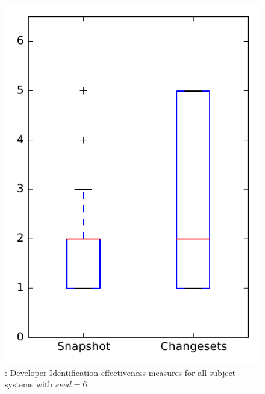 
\begin{figure}
\centering
\includegraphics[height=0.4\textheight]{figures/dit_seed/rq1_overview_6}
\caption{\rtwo: Developer Identification effectiveness measures for all subject systems with $seed=6$}
\label{fig:dit_seed:rq1:overview}
\end{figure}
